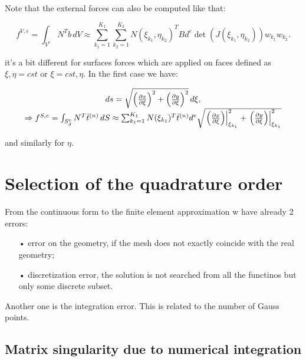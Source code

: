 	Note that the external forces can also be computed like that: 
	
	\begin{equation}
	f^{V,e} = \int _{V^e} N^T b\, dV \approx \sum _{k_1=1}^{K_1} \sum _{k_2=1}^{K_2} N(\xi _{k_1}, \eta _{k_2})^T B d^e \det(J(\xi_{k_1}, \eta _{k_2})) w_{k_1} w_{k_2}. 
	\end{equation}
	
	it's a bit different for surfaces forces which are applied on faces defined as $\xi, \eta = cst$ or $\xi = cst, \eta$. In the first case we have: 
	
	\begin{equation}
	\begin{array}{c}
	ds = \sqrt{\left( \frac{\partial x}{\partial \xi} \right)^2 + \left( \frac{\partial y}{\partial \xi} \right)^2} \, d\xi,\\
	\Rightarrow f^{S,e} = \int _{S_d^e} N^T \bar{t}^{(n)} \, dS \approx \sum_{k_1 = 1}^{K_1} N(\xi _{k_1})^T \bar{t} ^{(n)} d^e \sqrt{\left.\left( \frac{\partial x}{\partial \xi} \right)\right|^2_{\xi _{k_1}} + \left.\left( \frac{\partial y}{\partial \xi} \right)\right|^2_{\xi _{k_1}}}
	\end{array}
	\end{equation}
	
	and similarly for $\eta$. 
	
\section{Selection of the quadrature order}
	From the continuous form to the finite element approximation w have already 2 errors: 
	
	\begin{itemize}
	\item[•] error on the geometry, if the mesh does not exactly coincide with the real geometry;
	
	\item[•] discretization error, the solution is not searched from all the functinos but only some discrete subset.
	\end{itemize}
	
	Another one is the integration error. This is related to the number of Gauss points. 
	
\subsection{Matrix singularity due to numerical integration}
	
